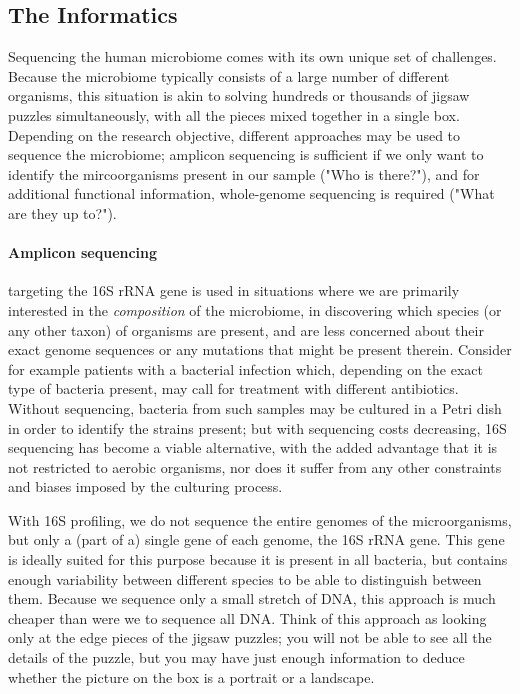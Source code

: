 \begin{justify}
\subsection{The Informatics}

Sequencing the human microbiome comes with its own unique set of challenges. Because the microbiome typically consists of a large number of different organisms, this situation is akin to solving hundreds or thousands of jigsaw puzzles simultaneously, with all the pieces mixed together in a single box. Depending on the research objective, different approaches may be used to sequence the microbiome; amplicon sequencing is sufficient if we only want to identify the mircoorganisms present in our sample ("Who is there?"), and for additional functional information, whole-genome sequencing is required ("What are they up to?")\cite{ranjan2016analysis}.

\paragraph{Amplicon sequencing} targeting the 16S rRNA gene is used in situations where we are primarily interested in the \emph{composition} of the microbiome, in discovering which species (or any other taxon) of organisms are present, and are less concerned about their exact genome sequences or any mutations that might be present therein. Consider for example patients with a bacterial infection which, depending on the exact type of bacteria present, may call for treatment with different antibiotics. Without sequencing, bacteria from such samples may be cultured in a Petri dish in order to identify the strains present; but with sequencing costs decreasing, 16S sequencing has become a viable alternative, with the added advantage that it is not restricted to aerobic organisms, nor does it suffer from any other constraints and biases imposed by the culturing process.

With 16S profiling, we do not sequence the entire genomes of the microorganisms, but only a (part of a) single gene of each genome, the 16S rRNA gene. This gene is ideally suited for this purpose because it is present in all bacteria, but contains enough variability between different species to be able to distinguish between them. Because we sequence only a small stretch of DNA, this approach is much cheaper than were we to sequence all DNA\@. Think of this approach as looking only at the edge pieces of the jigsaw puzzles; you will not be able to see all the details of the puzzle, but you may have just enough information to deduce whether the picture on the box is a portrait or a landscape.



\end{justify}
